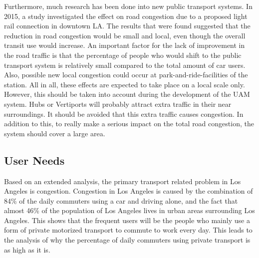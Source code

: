 Furthermore, much research has been done into new public transport systems. In 2015, a study \cite{lightrail} investigated the effect on road congestion due to a proposed light rail connection in downtown LA. The results that were found suggested that the reduction in road congestion would be small and local, even though the overall transit use would increase. An important factor for the lack of improvement in the road traffic is that the percentage of people who would shift to the public transport system is relatively small compared to the total amount of car users. Also, possible new local congestion could occur at park-and-ride-facilities of the station. All in all, these effects are expected to take place on a local scale only. However, this should be taken into account during the development of the UAM system. Hubs or Vertiports will probably attract extra traffic in their near surroundings. It should be avoided that this extra traffic causes congestion. In addition to this, to really make a serious impact on the total road congestion, the system should cover a large area. 

\subsection{User Needs}
\label{needs}
Based on an extended analysis, the primary transport related problem in Los Angeles is congestion. Congestion in Los Angeles is caused by the combination of 84\% of the daily commuters using a car and driving alone, and the fact that almost 46\% of the population of Los Angeles lives in urban areas surrounding Los Angeles. This shows that the frequent users will be the people who mainly use a form of private motorized transport to commute to work every day. This leads to the analysis of why the percentage of daily commuters using private transport is as high as it is. 

